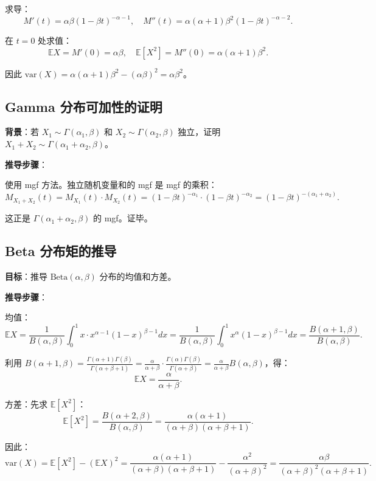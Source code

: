 求导：
\[
M'(t) = \alpha\beta(1-\beta t)^{-\alpha-1}, \quad M''(t) = \alpha(\alpha+1)\beta^{2}(1-\beta t)^{-\alpha-2}.
\]

在 $t=0$ 处求值：
\[
\mathbb{E}X = M'(0) = \alpha\beta, \quad \mathbb{E}[X^{2}] = M''(0) = \alpha(\alpha+1)\beta^{2}.
\]

因此 $\text{var}(X) = \alpha(\alpha+1)\beta^{2} - (\alpha\beta)^{2} = \alpha\beta^{2}$。

\subsection{Gamma 分布可加性的证明}\label{sec:derivation-gamma-additivity}

\textbf{背景}：若 $X_1 \sim \Gamma(\alpha_1, \beta)$ 和 $X_2 \sim \Gamma(\alpha_2, \beta)$ 独立，证明 $X_1 + X_2 \sim \Gamma(\alpha_1 + \alpha_2, \beta)$。

\textbf{推导步骤}：

使用 mgf 方法。独立随机变量和的 mgf 是 mgf 的乘积：
\[
M_{X_1+X_2}(t) = M_{X_1}(t) \cdot M_{X_2}(t) = (1-\beta t)^{-\alpha_1} \cdot (1-\beta t)^{-\alpha_2} = (1-\beta t)^{-(\alpha_1+\alpha_2)}.
\]

这正是 $\Gamma(\alpha_1 + \alpha_2, \beta)$ 的 mgf。证毕。

\subsection{Beta 分布矩的推导}\label{sec:derivation-beta-moments}

\textbf{目标}：推导 $\text{Beta}(\alpha, \beta)$ 分布的均值和方差。

\textbf{推导步骤}：

均值：
\[
\mathbb{E}X = \frac{1}{B(\alpha,\beta)} \int_{0}^{1} x \cdot x^{\alpha-1}(1-x)^{\beta-1} dx = \frac{1}{B(\alpha,\beta)} \int_{0}^{1} x^{\alpha}(1-x)^{\beta-1} dx = \frac{B(\alpha+1,\beta)}{B(\alpha,\beta)}.
\]

利用 $B(\alpha+1,\beta) = \frac{\Gamma(\alpha+1)\Gamma(\beta)}{\Gamma(\alpha+\beta+1)} = \frac{\alpha}{\alpha+\beta} \cdot \frac{\Gamma(\alpha)\Gamma(\beta)}{\Gamma(\alpha+\beta)} = \frac{\alpha}{\alpha+\beta} B(\alpha,\beta)$，得：
\[
\mathbb{E}X = \frac{\alpha}{\alpha+\beta}.
\]

方差：先求 $\mathbb{E}[X^{2}]$：
\[
\mathbb{E}[X^{2}] = \frac{B(\alpha+2,\beta)}{B(\alpha,\beta)} = \frac{\alpha(\alpha+1)}{(\alpha+\beta)(\alpha+\beta+1)}.
\]

因此：
\[
\text{var}(X) = \mathbb{E}[X^{2}] - (\mathbb{E}X)^{2} = \frac{\alpha(\alpha+1)}{(\alpha+\beta)(\alpha+\beta+1)} - \frac{\alpha^{2}}{(\alpha+\beta)^{2}} = \frac{\alpha\beta}{(\alpha+\beta)^{2}(\alpha+\beta+1)}.
\]

